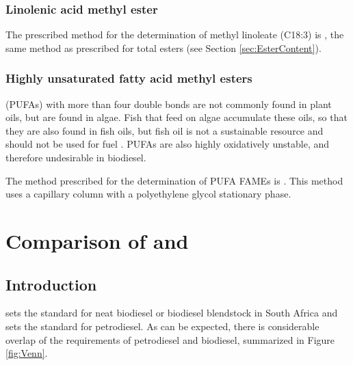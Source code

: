 \subsubsection{Linolenic acid methyl ester}

The prescribed method for the determination of methyl linoleate (C18:3) is
, the same method as prescribed for total esters (see Section
\ref{sec:EsterContent}).

\subsubsection{Highly unsaturated fatty acid methyl esters}

 (PUFAs) with more than four double bonds are
not commonly found in plant oils, but are found in algae. Fish that feed on
algae accumulate these oils, so that they are also found in fish oils, but fish
oil is not a sustainable resource and should not be used for fuel
\autocite{Kitessa2014}. PUFAs are also highly oxidatively unstable, and
therefore undesirable in biodiesel.

The method prescribed for the determination of PUFA FAMEs is .
This method uses a capillary column with a polyethylene glycol stationary phase.

\section{Comparison of  and }

\subsection{Introduction}
\label{sec:Comparison}

 sets the standard for neat biodiesel or biodiesel blendstock in
South Africa and  sets the standard for petrodiesel. As can be
expected, there is considerable overlap of the requirements of petrodiesel and
biodiesel, summarized in Figure \ref{fig:Venn}.

